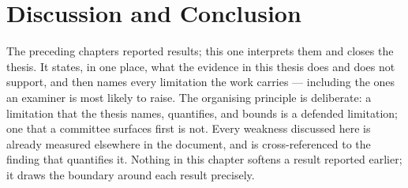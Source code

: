 %
%
%
\chapter{Discussion and Conclusion}
\label{ch:conclusion}

The preceding chapters reported results; this one interprets them and closes the
thesis. It states, in one place, what the evidence in this thesis does and does not
support, and then names every
limitation the work carries --- including the ones an examiner is most likely to raise.
The organising principle is deliberate: a limitation that the thesis names, quantifies,
and bounds is a defended limitation; one that a committee surfaces first is not. Every
weakness discussed here is already measured elsewhere in the document, and is
cross-referenced to the finding that quantifies it. Nothing in this chapter softens a
result reported earlier; it draws the boundary around each result precisely.

